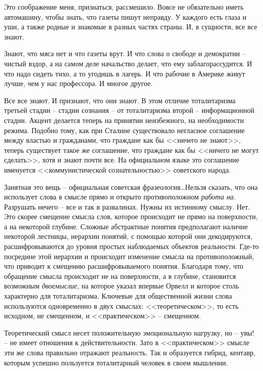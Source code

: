 \documentclass{book}
\begin{document}
Это соображение меня, признаться, рассмешило. Вовсе не обязательно иметь автомашину, чтобы знать, что газеты пишут неправду. У каждого есть глаза и уши, а также родные и знакомые в разных частях страны. И, в сущности, все все знают.

Знают, что мяса нет и что газеты врут. И что слова о свободе и демократии -- чистый вздор, а на самом деле начальство делает, что ему заблагорассудится. И что надо сидеть тихо, а то угодишь в лагерь. И что рабочие в Америке живут лучше, чем у нас профессора. И многое другое.

Все все знают. И признают, что они знают. В этом отличие тоталитаризма третьей стадии -- стадии сознания -- от тоталитаризма второй -- информационной стадии. Акцент делается теперь на принятии неизбежного, на необходимости режима. Подобно тому, как при Сталине существовало негласное соглашение между властью и гражданами, что граждане как бы <<ничего не знают>>, теперь существует такое же соглашение, что граждане как бы <<ничего не могут сделать>>, хотя и знают почти все. На официальном языке это соглашение именуется <<комму­нистической сознательностью>> советского народа.

Занятная это вещь -- официальная советская фразеология\ldots Нельзя сказать, что она использует слова в смысле прямо и открыто противоположном \textit{работа на}.  Разрушать нечего -- все и так в развалинах. Нужны их истинному смыслу. Нет. Это скорее смещение смысла слов, которое происходит не прямо на поверхности, а на некоторой глубине. Сложные абстракт­ные понятия предполагают наличие некоторой лестницы, ие­рархии понятий, с помощью которой они декодируются, рас­шифровываются до уровня простых наблюдаемых объектов реальности. Где-то посредине этой иерархии и происходит изме­нение смысла на противоположный, что приводит к смещению расшифровываемого понятия. Благодаря тому, что обращение смысла происходит не на поверхности, а в глубине, становит­ся возможным \textit{двоемыслие},  на которое указал впервые Орвелл и которое столь характерно для тоталитаризма. Ключе­вые для общественной жизни слова используются одновре­менно в двух смыслах: <<теоретическом>>, то есть исходном, не смещенном, и <<практическом>> -- смещенном. 

Теоретиче­ский смысл несет положительную эмоциональную нагрузку, но -- увы! -- не имеет отношения к действительности. Зато в <<практическом>> смысле эти же слова правильно отражают реальность. Так и образуется гибрид, кентавр, которым успеш­но пользуется тоталитарный человек в своем мышлении.
\end{document}
